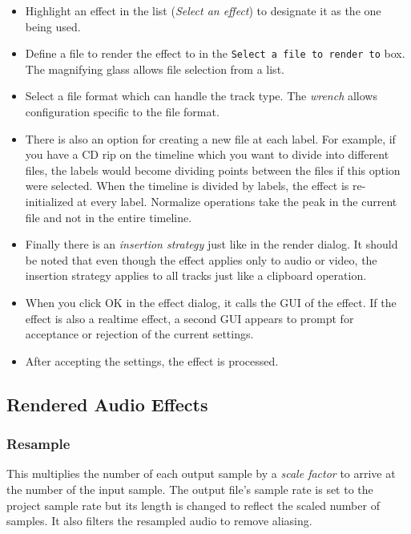 \begin{itemize}
    \item Highlight an effect in the list (\textit{Select an effect}) to designate it as the one being used.
    \item Define a file to render the effect to in the \texttt{Select a file to render to} box. The magnifying glass allows file selection from a list.
    \item Select a file format which can handle the track type. The \textit{wrench} allows configuration specific to the file format.
    \item There is also an option for creating a new file at each label. For example, if you have a CD rip on the timeline which you want to divide into different files, the labels would become dividing points between the files if this option were selected. When the timeline is divided by labels, the effect is re-initialized at every label. Normalize operations take the peak in the current file and not in the entire timeline.
    \item Finally there is an \textit{insertion strategy} just like in the render dialog. It should be noted that even though the effect applies only to audio or video, the insertion strategy applies to all tracks just like a clipboard operation.
    \item When you click OK in the effect dialog, it calls the GUI of the effect. If the effect is also a realtime effect, a second GUI appears to prompt for acceptance or rejection of the current settings.
    \item After accepting the settings, the effect is processed.
\end{itemize}

\subsection{Rendered Audio Effects}%
\label{sub:renederd_audio_effets}

\subsubsection*{Resample}%
\label{ssub:resample}

This multiplies the number of each output sample by a \textit{scale factor} to arrive at the number of the input sample. The output file's sample rate is set to the project sample rate but its length is changed to reflect the scaled number of samples. It also filters the resampled audio to remove aliasing.

